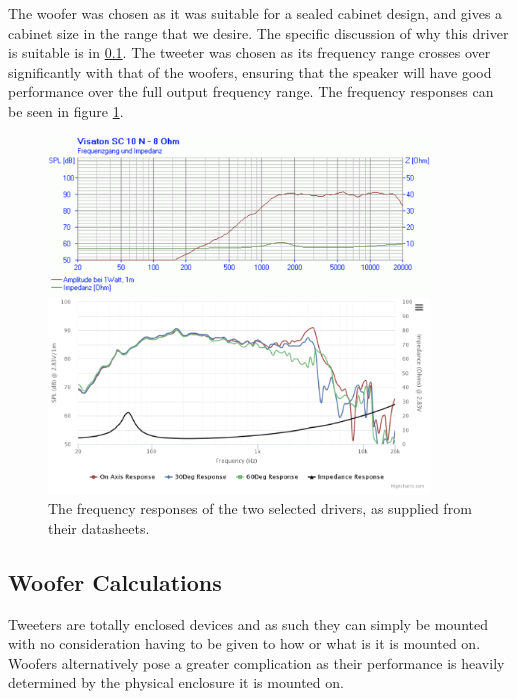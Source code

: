 \documentclass[main.tex]{subfiles}
\begin{document}
The woofer was chosen as it was suitable for a sealed cabinet design, and gives a cabinet size in the range that we desire.
The specific discussion of why this driver is suitable is in \ref{woofercalcs}.
The tweeter was chosen as its frequency range crosses over significantly with that of the woofers, ensuring that the speaker will have good performance over the full output frequency range.
The frequency responses can be seen in figure \ref{fig:driverFreqResponse}.
\begin{figure}
    \centering
    \includegraphics[width=0.9\textwidth]{figs/tweeter-response.png}
    
    \includegraphics[width=0.9\textwidth]{figs/woofer-response.png}
    \caption{The frequency responses of the two selected drivers, as supplied from their datasheets.\cite{tweeter,woofer}}
    \label{fig:driverFreqResponse}
\end{figure}

\subsection{Woofer Calculations}
\label{woofercalcs}
Tweeters are totally enclosed devices and as such they can simply be mounted with no consideration having to be given to how or what is it is mounted on.
Woofers alternatively pose a greater complication as their performance is heavily determined by the physical enclosure it is mounted on.
\end{document}
